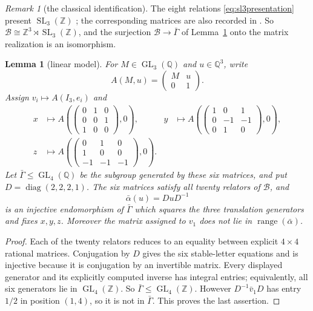 \documentclass[11pt]{amsart}
\newcommand{\leanverified}[2]{\ignorespaces}
\newtheorem{lemma}[theorem]{Lemma}
\theoremstyle{definition}
\theoremstyle{remark}
\newtheorem{remark}[theorem]{Remark}
\theoremstyle{plain}
\newcommand{\SL}{\operatorname{SL}}
\newcommand{\GL}{\operatorname{GL}}
\begin{document}
\begin{remark}[the classical identification]\label{rem:classical-base}
The eight relations \eqref{eq:sl3presentation} present
$\SL_3(\mathbb Z)$ \cite[Theorem~2]{CRW}; the corresponding matrices
are also recorded in \cite{CLV}.  So
$\mathcal B\cong\mathbb Z^3\rtimes\SL_3(\mathbb Z)$, and the
surjection $\mathcal B\to\bar\Gamma$ of Lemma~\ref{lem:linear} onto
the matrix realization is an isomorphism.
\leanverified{Monsters/LiteralBaseCompleteness}{GroupApproximation.LiteralBaseCompleteness.baseAffineEquiv}
\end{remark}

\begin{lemma}[linear model]\label{lem:linear}
For $M\in\GL_3(\mathbb Q)$ and $u\in\mathbb Q^3$, write
\[
 A(M,u)=\begin{pmatrix}M&u\\0&1\end{pmatrix}.
\]
Assign $v_i\mapsto A(I_3,e_i)$ and
\[
\begin{aligned}
 x&\mapsto A\!\left(\begin{pmatrix}0&1&0\\0&0&1\\1&0&0\end{pmatrix},0\right),
&y&\mapsto A\!\left(\begin{pmatrix}1&0&1\\0&-1&-1\\0&1&0\end{pmatrix},0\right),\\[3pt]
 z&\mapsto A\!\left(\begin{pmatrix}0&1&0\\1&0&0\\-1&-1&-1\end{pmatrix},0\right).
\end{aligned}
\]
Let $\bar\Gamma\le\GL_4(\mathbb Q)$ be the subgroup generated by these six
matrices, and put
$D=\operatorname{diag}(2,2,2,1)$.  The six matrices satisfy all twenty
relators of $\mathcal B$, and
\[
 \bar\alpha(u)=DuD^{-1}
\]
is an injective endomorphism of $\bar\Gamma$ which squares the three
translation generators and fixes $x,y,z$.  Moreover the matrix assigned to
$v_1$ does not lie in $\operatorname{range}(\bar\alpha)$.
\leanverified{Sofic/ManuscriptExactWrappers}{GroupApproximation.ManuscriptExactWrappers.manuscriptLinearModel}
\end{lemma}

\begin{proof}
Each of the twenty relators reduces to an equality between explicit
$4\times4$ rational matrices.  Conjugation by $D$ gives the six stable-letter equations
and is injective because it is conjugation by an invertible matrix.  Every
displayed generator and its explicitly computed inverse has integral entries;
equivalently, all six generators lie in $\GL_4(\mathbb Z)$.  So
$\bar\Gamma\le\GL_4(\mathbb Z)$.  However $D^{-1}\bar v_1D$ has entry $1/2$
in position $(1,4)$, so it is not in $\bar\Gamma$.  This proves the last
assertion.
\end{proof}
\end{document}
